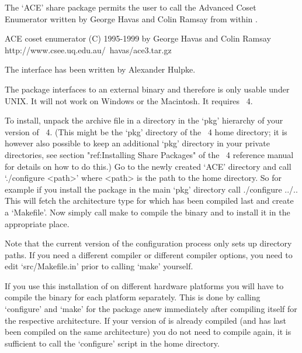 

The `ACE' share package permits the user to call the Advanced Coset 
Enumerator written by George Havas and Colin Ramsay from within {\GAP}. 

\begintt
ACE coset enumerator (C) 1995-1999 by George Havas and Colin Ramsay
    http://www.csee.uq.edu.au/~havas/ace3.tar.gz
\endtt

The {\GAP} interface has been written by Alexander Hulpke.

The package interfaces to an external binary and therefore is only usable
under UNIX. It will not work on Windows or the Macintosh. It requires
{\GAP}~4.


To install, unpack the archive file in a directory in the `pkg' hierarchy of
your version of {\GAP}~4. (This might be the `pkg' directory of the
{\GAP}~4 home directory; it is however also possible to keep an additional
`pkg' directory in your private directories, see section "ref:Installing
Share Packages" of the {\GAP}~4 reference manual for details on how to do
this.) Go to the newly created `ACE' directory and call `./configure <path>'
where <path> is the path to the {\GAP} home directory. So for example if you
install the package in the main `pkg' directory call
\begintt
./configure ../..
\endtt
This will fetch the architecture type for which {\GAP} has been compiled last
and create a `Makefile'. 
Now simply call
\begintt
make
\endtt
to compile the binary and to install it in the appropriate place.

Note that the current version of the configuration process only sets up
directory paths. If you need a different compiler or different compiler
options, you need to edit `src/Makefile.in' prior to calling `make'
yourself.

If you use this installation of {\GAP} on different hardware platforms you will
have to compile the binary for each platform separately. This is done by
calling `configure' and `make' for the package anew immediately after
compiling {\GAP} itself for the respective architecture.
If your version of {\GAP} is already compiled (and has last been compiled on
the same architecture) you do not need to compile {\GAP}
again, it is sufficient to call the `configure' script in the {\GAP} home
directory.

